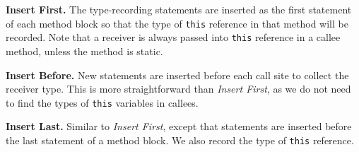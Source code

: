 \documentclass{fac}
\begin{document}
\textbf{Insert First.}
The type-recording statements are inserted as the first statement of each method block so that the type of \texttt{this} reference in that method will be recorded. %
Note that a receiver is always passed into \texttt{this} reference in a callee method, unless the method is static. %

\textbf{Insert Before.}
New statements are inserted  before each call site to collect the receiver type. This is more straightforward than \emph{Insert First}, as we do not need to find the types of \texttt{this} variables in callees.

\textbf{Insert Last.}
Similar to \emph{Insert First}, except that statements are inserted before the last statement of a method block. We also record the type of \texttt{this} reference. %
\end{document}
